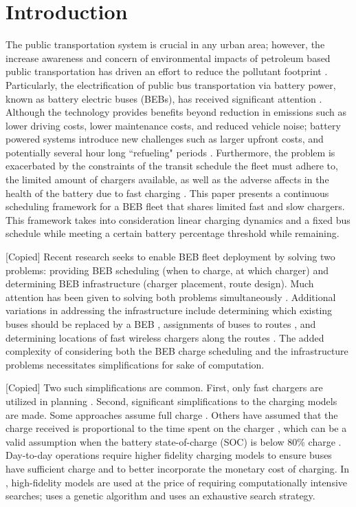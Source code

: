 \documentclass[letterpaper, 10pt, conference]{IEEEtran}
\begin{document}
\section{Introduction}
\label{sec:introduction}
The public transportation system is crucial in any urban area; however, the increase awareness and concern of environmental impacts of petroleum based public transportation has driven an effort to reduce the pollutant footprint \cite{DeFilippo2014, Xylia2018, Guida2017, Li2016}. Particularly, the electrification of public bus transportation via battery power, known as battery electric buses (BEBs), has received significant attention \cite{Li2016}. Although the technology provides benefits beyond reduction in emissions such as lower driving costs, lower maintenance costs, and reduced vehicle noise; battery powered systems introduce new challenges such as larger upfront costs, and potentially several hour long ``refueling" periods \cite{Xylia2018, Li2016}. Furthermore, the problem is exacerbated by the constraints of the transit schedule the fleet must adhere to, the limited amount of chargers available, as well as the adverse affects in the health of the battery due to fast charging \cite{Lutsey2019}. This paper presents a continuous scheduling framework for a BEB fleet that shares limited fast and slow chargers. This framework takes into consideration linear charging dynamics and a fixed bus schedule while meeting a certain battery percentage threshold while remaining.

[Copied] Recent research seeks to enable BEB fleet deployment by solving two problems: providing BEB scheduling (when to charge, at which charger) and determining BEB infrastructure (charger placement, route design). Much attention has been given to solving both problems simultaneously \cite{Wei2018, Sebastiani2016, Hoke2014, Wang2017}. Additional variations in addressing the infrastructure include determining which existing buses should be replaced by a BEB \cite{Zhou2020}, assignments of buses to routes \cite{Liu2020}, and determining locations of fast wireless chargers along the routes \cite{Yang2018, Wang2017a}. The added complexity of considering both the BEB charge scheduling and the infrastructure problems necessitates simplifications for sake of computation.

[Copied] Two such simplifications are common. First, only fast chargers are utilized in planning \cite{Wei2018, Sebastiani2016, Wang2017, Zhou2020, Liu2020, Yang2018, Wang2017a, Qin2016}. Second, significant simplifications to the charging models are made. Some approaches assume full charge \cite{Wei2018, Wang2017, Zhou2020, Wang2017a}. Others have assumed that the charge received is proportional to the time spent on the charger \cite{Liu2020, Yang2018}, which can be a valid assumption when the battery state-of-charge (SOC) is below 80\% charge \cite{Liu2020}. Day-to-day operations require higher fidelity charging models to ensure buses have sufficient charge and to better incorporate the monetary cost of charging. In \cite{Sebastiani2016, Qin2016}, high-fidelity models are used at the price of requiring computationally intensive searches; \cite{Sebastiani2016} uses a genetic algorithm and \cite{Qin2016} uses an exhaustive search strategy.
\end{document}

